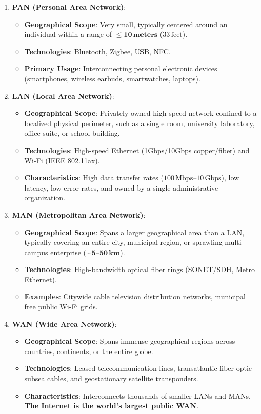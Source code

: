 \begin{enumerate}[leftmargin=1.5em]
    \item \textbf{PAN (Personal Area Network)}:
    \begin{itemize}
        \item \textbf{Geographical Scope}: Very small, typically centered around an individual within a range of \textbf{$\le \mathbf{10\,\text{meters}}$} ($33\,\text{feet}$).
        \item \textbf{Technologies}: Bluetooth, Zigbee, USB, NFC.
        \item \textbf{Primary Usage}: Interconnecting personal electronic devices (smartphones, wireless earbuds, smartwatches, laptops).
    \end{itemize}

    \item \textbf{LAN (Local Area Network)}:
    \begin{itemize}
        \item \textbf{Geographical Scope}: Privately owned high-speed network confined to a localized physical perimeter, such as a single room, university laboratory, office suite, or school building.
        \item \textbf{Technologies}: High-speed Ethernet (1Gbps/10Gbps copper/fiber) and Wi-Fi (IEEE 802.11ax).
        \item \textbf{Characteristics}: High data transfer rates ($100\,\text{Mbps}\text{--}10\,\text{Gbps}$), low latency, low error rates, and owned by a single administrative organization.
    \end{itemize}

    \item \textbf{MAN (Metropolitan Area Network)}:
    \begin{itemize}
        \item \textbf{Geographical Scope}: Spans a larger geographical area than a LAN, typically covering an entire city, municipal region, or sprawling multi-campus enterprise ($\sim \mathbf{5\text{--}50\,\text{km}}$).
        \item \textbf{Technologies}: High-bandwidth optical fiber rings (SONET/SDH, Metro Ethernet).
        \item \textbf{Examples}: Citywide cable television distribution networks, municipal free public Wi-Fi grids.
    \end{itemize}

    \item \textbf{WAN (Wide Area Network)}:
    \begin{itemize}
        \item \textbf{Geographical Scope}: Spans immense geographical regions across countries, continents, or the entire globe.
        \item \textbf{Technologies}: Leased telecommunication lines, transatlantic fiber-optic subsea cables, and geostationary satellite transponders.
        \item \textbf{Characteristics}: Interconnects thousands of smaller LANs and MANs. \textbf{The Internet is the world's largest public WAN}.
    \end{itemize}
\end{enumerate}

